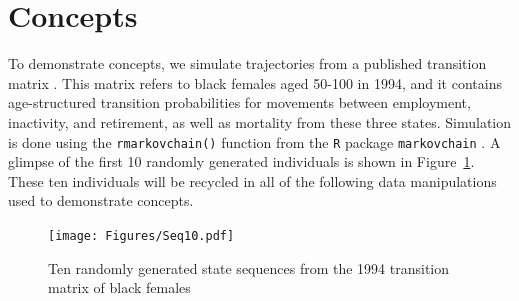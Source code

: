 \documentclass{article}
\begin{document}

\section{Concepts}
To demonstrate concepts, we simulate trajectories from a published transition matrix \citep{Dudel2017}. This matrix refers to black females aged 50-100 in 1994, and it contains age-structured transition probabilities for movements between employment, inactivity, and retirement, as well as mortality from these three states. Simulation is done using the \texttt{rmarkovchain()} function from the \texttt{R} package \texttt{markovchain} \citep{spedicato2017}. A glimpse of the first 10 randomly generated individuals is shown in Figure~\ref{fig:seq10}. These ten individuals will be recycled in all of the following data manipulations used to demonstrate concepts. 

\begin{figure}[ht!]
\centering
\texttt{[image: Figures/Seq10.pdf]}
\caption{Ten randomly generated state sequences from the 1994 transition matrix
of black females \citep{Dudel2017}}
\label{fig:seq10}
\end{figure}
\end{document}
